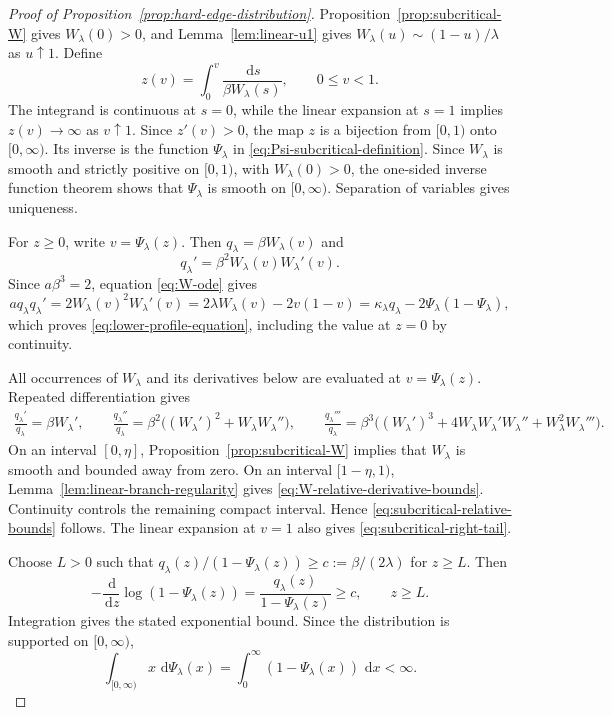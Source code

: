 \documentclass[12pt]{amsart}
\numberwithin{equation}{section}
\theoremstyle{plain}
\theoremstyle{definition}
\newcommand{\dd}{\,\mathrm d}
\begin{document}
\begin{proof}[Proof of Proposition~\ref{prop:hard-edge-distribution}]
Proposition~\ref{prop:subcritical-W} gives $W_{\lambda}(0)>0$, and
Lemma~\ref{lem:linear-u1} gives
$W_{\lambda}(u)\sim(1-u)/\lambda$ as $u\uparrow1$.  Define
\[
 z(v)=\int_0^v\frac{\dd s}{\beta W_{\lambda}(s)},
 \qquad 0\le v<1.
\]
The integrand is continuous at $s=0$, while the linear expansion at $s=1$
implies $z(v)\to\infty$ as $v\uparrow1$.  Since $z'(v)>0$, the map $z$ is
a bijection from $[0,1)$ onto $[0,\infty)$.  Its inverse is the function
$\Psi_{\lambda}$ in \eqref{eq:Psi-subcritical-definition}.  Since
$W_{\lambda}$ is smooth and strictly positive on $[0,1)$, with
$W_{\lambda}(0)>0$, the one-sided inverse function theorem shows that
$\Psi_{\lambda}$ is smooth on $[0,\infty)$.  Separation of variables gives
uniqueness.

For $z\ge0$, write $v=\Psi_{\lambda}(z)$.  Then
$q_{\lambda}=\beta W_{\lambda}(v)$ and
\[
 q_{\lambda}'=\beta^2W_{\lambda}(v)W_{\lambda}'(v).
\]
Since $a\beta^3=2$, equation \eqref{eq:W-ode} gives
\[
 a q_{\lambda}q_{\lambda}'
 =2W_{\lambda}(v)^2W_{\lambda}'(v)
 =2\lambda W_{\lambda}(v)-2v(1-v)
 =\kappa_{\lambda}q_{\lambda}
  -2\Psi_{\lambda}(1-\Psi_{\lambda}),
\]
which proves \eqref{eq:lower-profile-equation}, including the value at
$z=0$ by continuity.

All occurrences of $W_{\lambda}$ and its derivatives below are evaluated at
$v=\Psi_{\lambda}(z)$.  Repeated differentiation gives
\[
\begin{aligned}
 \frac{q_{\lambda}'}{q_{\lambda}}
 =\beta W_{\lambda}',\qquad
 \frac{q_{\lambda}''}{q_{\lambda}}
 =\beta^2\bigl((W_{\lambda}')^2
   +W_{\lambda}W_{\lambda}''\bigr),\qquad
 \frac{q_{\lambda}'''}{q_{\lambda}}
 =\beta^3\bigl((W_{\lambda}')^3
   +4W_{\lambda}W_{\lambda}'W_{\lambda}''
   +W_{\lambda}^2W_{\lambda}'''\bigr).
\end{aligned}
\]
On an interval $[0,\eta]$, Proposition~\ref{prop:subcritical-W} implies that
$W_{\lambda}$ is smooth and bounded away from zero.  On an interval
$[1-\eta,1)$, Lemma~\ref{lem:linear-branch-regularity} gives
\eqref{eq:W-relative-derivative-bounds}.  Continuity controls the remaining
compact interval.  Hence \eqref{eq:subcritical-relative-bounds} follows.
The linear expansion at $v=1$ also gives
\eqref{eq:subcritical-right-tail}.

Choose $L>0$ such that
$q_{\lambda}(z)/(1-\Psi_{\lambda}(z))\ge
c:=\beta/(2\lambda)$ for $z\ge L$.  Then
\[
 -\frac{\dd}{\dd z}\log(1-\Psi_{\lambda}(z))
 =\frac{q_{\lambda}(z)}{1-\Psi_{\lambda}(z)}\ge c,
 \qquad z\ge L.
\]
Integration gives the stated exponential bound.  Since the distribution is
supported on $[0,\infty)$,
\[
 \int_{[0,\infty)}x\,\dd\Psi_{\lambda}(x)
 =\int_0^\infty(1-\Psi_{\lambda}(x))\,\dd x<\infty.
\]


\end{proof}
\end{document}
